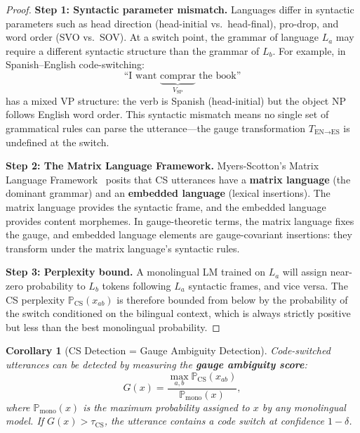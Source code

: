 \documentclass[12pt,a4paper]{article}
\newtheorem{corollary}[theorem]{Corollary}
\theoremstyle{remark}
\newcommand{\Pbb}{\mathbb{P}}
\begin{document}
\begin{proof}
\noindent\textbf{Step 1: Syntactic parameter mismatch.}
Languages differ in syntactic parameters such as head direction
(head-initial vs.\ head-final), pro-drop, and word order (SVO vs.\ SOV).
At a switch point, the grammar of language $L_a$ may require a
different syntactic structure than the grammar of $L_b$. For example,
in Spanish--English code-switching:
\begin{equation}
  \text{``I want } \underbrace{\text{comprar}}_{V_{\text{SP}}} \text{ the book''}
\end{equation}
has a mixed VP structure: the verb is Spanish (head-initial) but the
object NP follows English word order. This syntactic mismatch means
no single set of grammatical rules can parse the utterance---the
gauge transformation $T_{\text{EN}\to\text{ES}}$ is undefined at
the switch.

\smallskip
\noindent\textbf{Step 2: The Matrix Language Framework.}
Myers-Scotton's Matrix Language Framework~\cite{myers2002code} posits
that CS utterances have a \textbf{matrix language} (the dominant grammar)
and an \textbf{embedded language} (lexical insertions). The matrix
language provides the syntactic frame, and the embedded language
provides content morphemes. In gauge-theoretic terms, the matrix
language fixes the gauge, and embedded language elements are
gauge-covariant insertions: they transform under the matrix language's
syntactic rules.

\smallskip
\noindent\textbf{Step 3: Perplexity bound.}
A monolingual LM trained on $L_a$ will assign near-zero probability
to $L_b$ tokens following $L_a$ syntactic frames, and vice versa.
The CS perplexity $\Pbb_{\text{CS}}(x_{ab})$ is therefore bounded
from below by the probability of the switch conditioned on the
bilingual context, which is always strictly positive but less than
the best monolingual probability.
\end{proof}

\begin{corollary}[CS Detection = Gauge Ambiguity Detection]
\label{cor:cs_detection}
Code-switched utterances can be detected by measuring the \textbf{gauge
ambiguity score}:
\begin{equation}
  \label{eq:gauge_ambiguity}
  G(x) = \frac{\max_{a,b} \Pbb_{\text{CS}}(x_{ab})}{\Pbb_{\text{mono}}(x)},
\end{equation}
where $\Pbb_{\text{mono}}(x)$ is the maximum probability assigned
to $x$ by any monolingual model. If $G(x) > \tau_{\text{CS}}$, the
utterance contains a code switch at confidence $1-\delta$.
\end{corollary}
\end{document}
